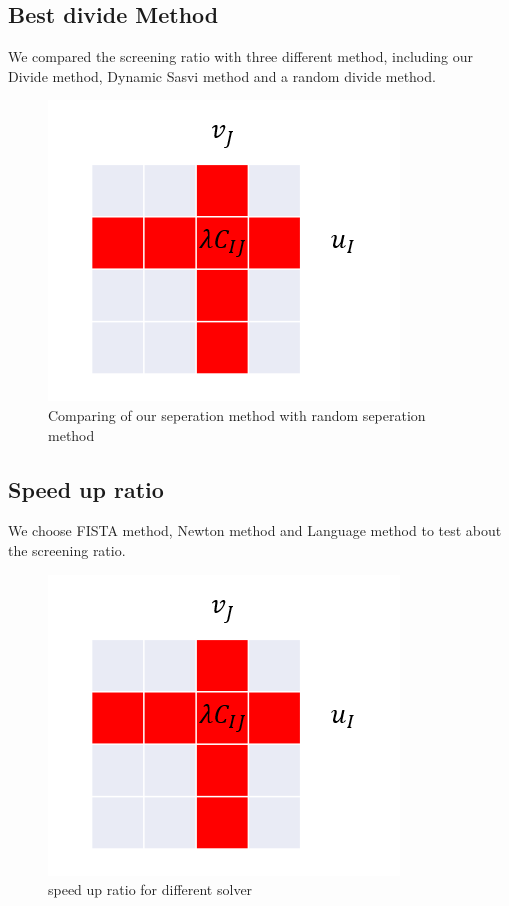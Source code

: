 \subsection{Best divide Method}
We compared the screening ratio with three different method, including our Divide method, Dynamic Sasvi method and a random divide method. 
	\begin{figure}[h]
	\begin{center}	
	\includegraphics[width = \linewidth]{pic/divide}
	\caption{Comparing of our seperation method with random seperation method}
	\end{center}	
	\end{figure}

\subsection{Speed up ratio}

We choose FISTA method, Newton method and Language method to test about the screening ratio. 
	\begin{figure}[h]
	\begin{center}	
	\includegraphics[width = \linewidth]{pic/divide}
	\caption{speed up ratio for different solver}
	\end{center}	
	\end{figure}